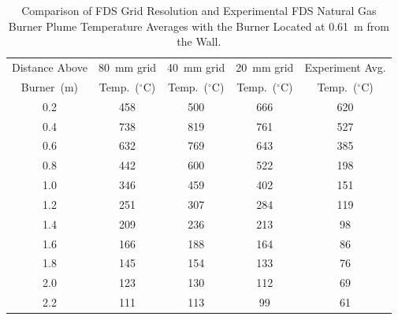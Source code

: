 \documentclass[twoside]{uocthesis}
\begin{document}
\begin{table}
	\small
	\centering
	\begin{tabular}{|c|c|c|c|c|}
		\hline Distance Above  & 80~mm grid      & 40~mm grid     & 20~mm grid 		& Experiment Avg. \\
		Burner~(m)	   & Temp.~($^{\circ}$C) & Temp.~($^{\circ}$C) & Temp.~($^{\circ}$C)  & Temp.~($^{\circ}$C)	\\ \hline
		\hline 0.2 			   & 458						& 500					& 666 			& 620 	\\
		\hline 0.4			   & 738					   	& 819					& 761			& 527 	\\
		\hline 0.6			   & 632						& 769					& 643			& 385 	\\
		\hline 0.8			   & 442						& 600					& 522			& 198	\\
		\hline 1.0			   & 346						& 459 					& 402			& 151	\\
		\hline 1.2			   & 251						& 307 					& 284			& 119	\\
		\hline 1.4			   & 209						& 236 					& 213			& 98	\\
		\hline 1.6			   & 166						& 188 					& 164			& 86	\\
		\hline 1.8			   & 145						& 154 					& 133			& 76	\\
		\hline 2.0			   & 123						& 130 					& 112			& 69	\\
		\hline 2.2			   & 111						& 113 					& 99			& 61	\\
		\hline
	\end{tabular}
	\caption[Comparison of FDS Grid Resolution and Experimental FDS Natural Gas Burner Plume Temperatures, 0.61~m from the Wall]{Comparison of FDS Grid Resolution and Experimental FDS Natural Gas Burner Plume Temperature Averages with the Burner Located at 0.61~m from the Wall.}
	\label{tab:FDSRI_Exp_Plume2d}
\end{table}
\end{document}
